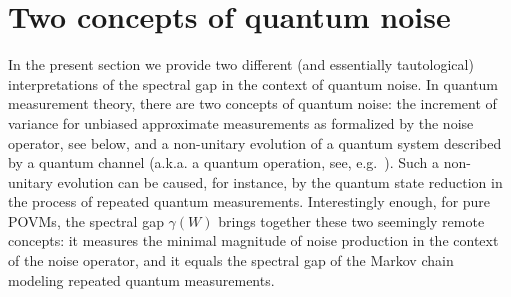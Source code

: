 \section{Two concepts of quantum noise}\label{sec-noise}
In the present section we provide two different (and essentially tautological) interpretations of the spectral gap in the context of quantum noise. In quantum measurement theory, there are two concepts of quantum noise: the increment of variance for unbiased approximate measurements as formalized by the noise operator, see below, and a non-unitary evolution of a quantum system described by a quantum channel (a.k.a. a quantum operation, see, e.g.~\cite[Chapter~8]{NC}). Such a non-unitary evolution can be caused, for instance, by the quantum state reduction in the process of repeated quantum measurements. Interestingly enough, for pure POVMs, the spectral gap $\gamma(W)$ brings together these two seemingly remote concepts: it measures the minimal magnitude of noise production in the context of the noise operator, and it equals the spectral gap of the Markov chain modeling repeated quantum measurements.

